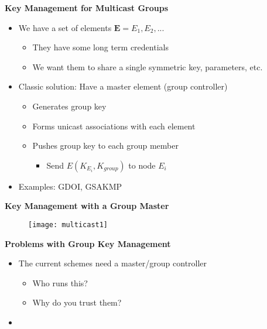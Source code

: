 \documentclass[helvetica]{seminar}
\newcommand{\heading}[1]{%
  \begin{center} 
    \large\bf 
    #1 
  \end{center} 
  \vspace{.4 in}}
\begin{document}
\begin{slide}
\heading{Key Management for Multicast Groups}

\begin{itemize}
\item We have a set of elements $\mathbf{E} = E_1, E_2, ...$ 
\begin{itemize}
\item They have some long term credentials
\item We want them to share a single symmetric key, parameters, etc.
\end{itemize}
\item Classic solution: Have a master element (group controller)
\begin{itemize}
\item Generates group key
\item Forms unicast associations with each element
\item Pushes group key to each group member
\begin{itemize}
\item Send $E(K_{E_i}, K_{group})$ to node $E_i$
\end{itemize}
\end{itemize} 
\item Examples: GDOI, GSAKMP
\end{itemize}
\end{slide}

\begin{slide}
\heading{Key Management with a Group Master}

\begin{figure}
\begin{center}
\texttt{[image: multicast1]}
\end{center}
\end{figure}
\end{slide}


\begin{slide}
\heading{Problems with Group Key Management}

\begin{itemize}
\item The current schemes need a master/group controller
\begin{itemize}
\item Who runs this?
\item Why do you trust them?
\end{itemize}
\item 
\end{itemize}

\end{slide}
\end{document}
